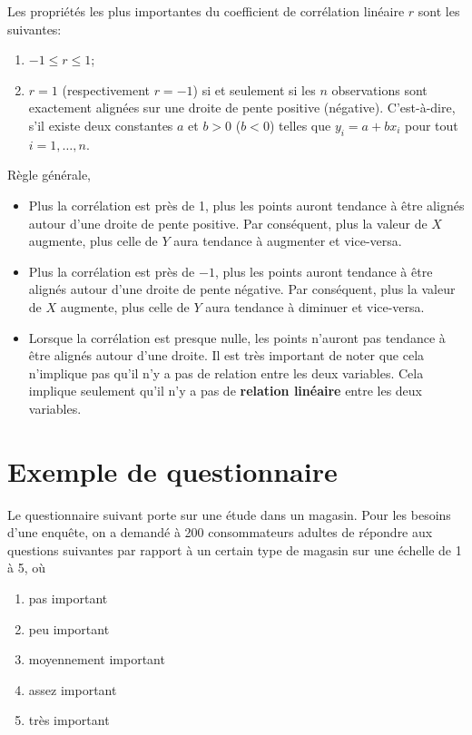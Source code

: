 \documentclass[
]{book}
\providecommand{\tightlist}{%
  \setlength{\itemsep}{0pt}\setlength{\parskip}{0pt}}
\theoremstyle{definition}
\theoremstyle{definition}
\theoremstyle{definition}
\theoremstyle{remark}
\begin{document}
Les propriétés les plus importantes du coefficient de corrélation linéaire \(r\) sont les suivantes:

\begin{enumerate}
\def\labelenumi{\arabic{enumi})}
\tightlist
\item
  \(-1 \leq r \leq 1\);
\item
  \(r=1\) (respectivement \(r=-1\)) si et seulement si les \(n\) observations sont exactement alignées sur une droite de pente positive (négative). C'est-à-dire, s'il existe deux constantes \(a\) et \(b>0\) (\(b<0\)) telles que \(y_i=a+b x_i\) pour tout \(i=1, \ldots, n\).
\end{enumerate}

Règle générale,

\begin{itemize}
\tightlist
\item
  Plus la corrélation est près de 1, plus les points auront tendance à être alignés autour d'une droite de pente positive. Par conséquent, plus la valeur de \(X\) augmente, plus celle de \(Y\) aura tendance à augmenter et vice-versa.
\item
  Plus la corrélation est près de \(-1\), plus les points auront tendance à être alignés autour d'une droite de pente négative. Par conséquent, plus la valeur de \(X\) augmente, plus celle de \(Y\) aura tendance à diminuer et vice-versa.
\item
  Lorsque la corrélation est presque nulle, les points n'auront pas tendance à être alignés autour d'une droite. Il est très important de noter que cela n'implique pas qu'il n'y a pas de relation entre les deux variables. Cela implique seulement qu'il n'y a pas de \textbf{relation linéaire} entre les deux variables.
\end{itemize}

\hypertarget{exemple-de-questionnaire}{%
\section{Exemple de questionnaire}\label{exemple-de-questionnaire}}

Le questionnaire suivant porte sur une étude dans un magasin. Pour les besoins d'une enquête, on a demandé à 200 consommateurs adultes de répondre aux questions suivantes par rapport à un certain type de magasin sur une échelle de 1 à 5, où

\begin{enumerate}
\def\labelenumi{\arabic{enumi}.}
\tightlist
\item
  pas important
\item
  peu important
\item
  moyennement important
\item
  assez important
\item
  très important
\end{enumerate}
\end{document}
